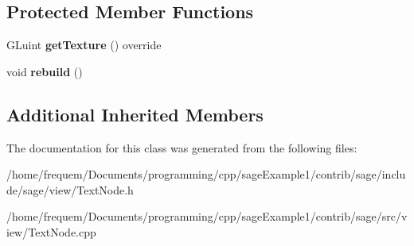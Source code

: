 \subsection*{Protected Member Functions}
\begin{DoxyCompactItemize}
\item 
\mbox{\label{classsage_1_1TextNode_ae21f17c6cb993692d8da89424b2581d7}} 
G\+Luint {\bfseries get\+Texture} () override
\item 
\mbox{\label{classsage_1_1TextNode_a7984e4a663f48338da018b780704b95f}} 
void {\bfseries rebuild} ()
\end{DoxyCompactItemize}
\subsection*{Additional Inherited Members}


The documentation for this class was generated from the following files\+:\begin{DoxyCompactItemize}
\item 
/home/frequem/\+Documents/programming/cpp/sage\+Example1/contrib/sage/include/sage/view/Text\+Node.\+h\item 
/home/frequem/\+Documents/programming/cpp/sage\+Example1/contrib/sage/src/view/Text\+Node.\+cpp\end{DoxyCompactItemize}
